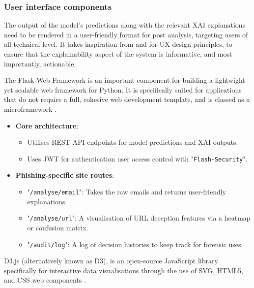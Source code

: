 
\subsubsection*{User interface components}
The output of the model's predictions along with the relevant XAI explanations need to be rendered in a user-friendly format for post analysis, targeting users of all technical level. It takes inspiration from \cite{van2024applicability} and \cite{greco2023explaining} for UX design principles, to ensure that the explainability aspect of the system is informative, and most importantly, actionable.\newline

\noindent The Flask Web Framework is an important component for building a lightwight yet scalable web framework for Python. It is specifically suited for applications that do not require a full, cohesive web development template, and is classed as a microframework \citep{pallets2010}.

\begin{itemize}
  \item \textbf{Core architecture}:
  \begin{itemize}
    \item Utilises REST API endpoints for model predictions and XAI outputs.
    \item Uses JWT for authentication user access control with "\texttt{Flash-Security}".
  \end{itemize}
  \item \textbf{Phishing-specific site routes}:
  \begin{itemize}
    \item "\texttt{/analyse/email}": Takes the raw emails and returns user-friendly explanations.
    \item "\texttt{/analyse/url}": A visualisation of URL deception features via a heatmap or confusion matrix.
    \item "\texttt{/audit/log}": A log of decision histories to keep track for forensic uses.
  \end{itemize}
\end{itemize}

\noindent D3.js (alternatively known as D3), is an open-source JavaScript library specifically for interactive data visualisations through the use of SVG, HTML5, and CSS web components \citep{observable2025d3}.

